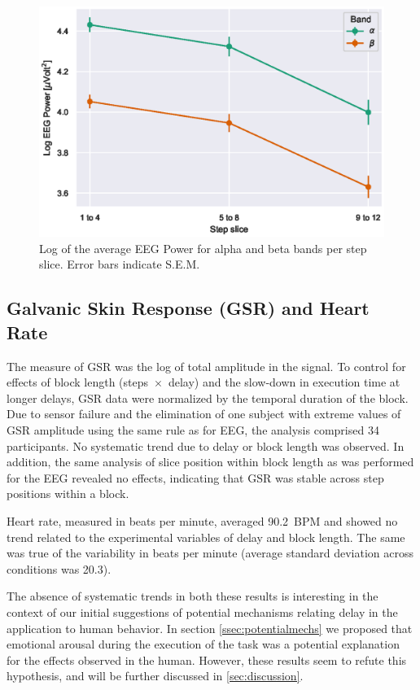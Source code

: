 \documentclass[10pt,letterpaper]{article}
\providecommand{\DIFaddtex}[1]{#1} %
\providecommand{\DIFdeltex}[1]{} %
\providecommand{\DIFaddFL}[1]{\DIFadd{#1}} %
\providecommand{\DIFdelFL}[1]{\DIFdel{#1}} %
\providecommand{\DIFaddbeginFL}{} %
\providecommand{\DIFaddendFL}{} %
\providecommand{\DIFdelbeginFL}{} %
\providecommand{\DIFdelendFL}{} %
\providecommand{\DIFadd}[1]{\texorpdfstring{\DIFaddtex{#1}}{#1}} %
\providecommand{\DIFdel}[1]{\texorpdfstring{\DIFdeltex{#1}}{}} %
\newcommand{\DIFscaledelfig}{0.5}
\newlength{\DIFdelgraphicswidth} %
\newlength{\DIFdelgraphicsheight} %
\newcommand{\DIFaddincludegraphics}[2][]{{\color{blue}\fbox{\DIFOincludegraphics[#1]{#2}}}} %
\newcommand{\DIFdelincludegraphics}[2][]{%
\sbox{\DIFdelgraphicsbox}{\DIFOincludegraphics[#1]{#2}}%
\settoboxwidth{\DIFdelgraphicswidth}{\DIFdelgraphicsbox} %
\settoboxtotalheight{\DIFdelgraphicsheight}{\DIFdelgraphicsbox} %
\scalebox{\DIFscaledelfig}{%
\parbox[b]{\DIFdelgraphicswidth}{\usebox{\DIFdelgraphicsbox}\\[-\baselineskip] \rule{\DIFdelgraphicswidth}{0em}}\llap{\resizebox{\DIFdelgraphicswidth}{\DIFdelgraphicsheight}{%
\setlength{\unitlength}{\DIFdelgraphicswidth}%
\begin{picture}(1,1)%
\thicklines\linethickness{2pt} %
{\color[rgb]{1,0,0}\put(0,0){\framebox(1,1){}}}%
{\color[rgb]{1,0,0}\put(0,0){\line( 1,1){1}}}%
{\color[rgb]{1,0,0}\put(0,1){\line(1,-1){1}}}%
\end{picture}%
}\hspace*{3pt}}} %
} %
\DeclareRobustCommand{\DIFaddbeginFL}{\DIFOaddbeginFL \let\includegraphics\DIFaddincludegraphics} %
\DeclareRobustCommand{\DIFaddendFL}{\DIFOaddendFL \let\includegraphics\DIFOincludegraphics} %
\DeclareRobustCommand{\DIFdelbeginFL}{\DIFOdelbeginFL \let\includegraphics\DIFdelincludegraphics} %
\DeclareRobustCommand{\DIFdelendFL}{\DIFOaddendFL \let\includegraphics\DIFOincludegraphics} %
\begin{document}
\begin{figure}[h]
    \centering
    \includegraphics[width=.8\textwidth]{plots/eeg_alpha_beta_vs_block_slice.eps}
    \caption{\DIFdelbeginFL \DIFdelFL{Mean }\DIFdelendFL Log \DIFaddbeginFL \DIFaddFL{of the average }\DIFaddendFL EEG Power for alpha and beta bands per step slice. Error bars indicate S.E.M.}\label{fig:logeegpow:slices}
\end{figure}

\subsection{Galvanic Skin Response (GSR) and Heart Rate}
The measure of GSR was the log of total amplitude in the signal.
To control for effects of block length (steps~\( \times \)~delay) and the slow-down in execution time at longer delays, GSR data were normalized by the temporal duration of the block.
Due to sensor failure and the elimination of one subject with extreme values of GSR amplitude using the same rule as for EEG, the analysis comprised 34 participants.
No systematic trend due to delay or block length was observed.
In addition, the same analysis of slice position within block length as was performed for the EEG revealed no effects, indicating that GSR was stable across step positions within a block. 

Heart rate, measured in beats per minute, averaged \num{90.2}~BPM and showed no trend related to the experimental variables of delay and block length.
The same was true of the variability in beats per minute (average standard deviation across conditions was \num{20.3}).

The absence of systematic trends in both these results is interesting in the context of our initial suggestions of potential mechanisms relating delay in the application to human behavior.
In section \cref{ssec:potentialmechs} we proposed that emotional arousal during the execution of the task was a potential explanation for the effects observed in the human.
However, these results seem to refute this hypothesis, and will be further discussed in \cref{sec:discussion}.
\end{document}
